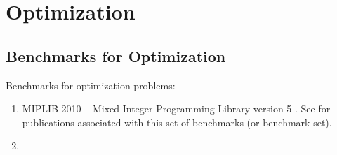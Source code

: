 









\chapter{Optimization}
\label{chp:Optimization}


\section{Benchmarks for Optimization}
\label{sec:BenchmarksForOptimization}

Benchmarks for optimization problems: \vspace{-0.3cm}
\begin{enumerate} \itemsep -4pt
\item MIPLIB 2010 -- Mixed Integer Programming Library version 5 \cite{Koch2011a}. See \cite{Achterberg2015a} for publications associated with this set of benchmarks (or benchmark set).
\item 
\end{enumerate}



